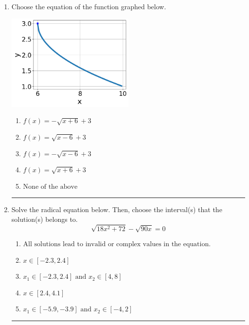 \documentclass[14pt]{extbook}
\newcommand{\litem}[1]{\item#1\hspace*{-1cm}\rule{\textwidth}{0.4pt}}
\begin{document}
\begin{enumerate}
{\begin{enumerate}[label=\Alph*.]
\end{enumerate} }
\litem{
Choose the equation of the function graphed below.
\begin{center}
    \includegraphics[width=0.5\textwidth]{../Figures/radicalGraphToEquationCopyA.png}
\end{center}
\begin{enumerate}[label=\Alph*.]
\item \( f(x) = - \sqrt{x + 6} + 3 \)
\item \( f(x) = \sqrt{x - 6} + 3 \)
\item \( f(x) = - \sqrt{x - 6} + 3 \)
\item \( f(x) = \sqrt{x + 6} + 3 \)
\item \( \text{None of the above} \)

\end{enumerate} }
\litem{
Solve the radical equation below. Then, choose the interval(s) that the solution(s) belongs to.\[ \sqrt{18 x^2 + 72} - \sqrt{90 x} = 0 \]\begin{enumerate}[label=\Alph*.]
\item \( \text{All solutions lead to invalid or complex values in the equation.} \)
\item \( x \in [-2.3,2.4] \)
\item \( x_1 \in [-2.3, 2.4] \text{ and } x_2 \in [4,8] \)
\item \( x \in [2.4,4.1] \)
\item \( x_1 \in [-5.9, -3.9] \text{ and } x_2 \in [-4,2] \)

\end{enumerate} }
\end{enumerate}
\end{document}
